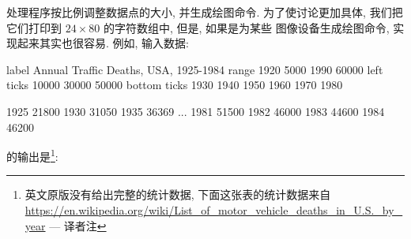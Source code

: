 处理程序按比例调整数据点的大小, 并生成绘图命令. 为了使讨论更加具体,
我们把它们打印到 $24 \times 80$ 的字符数组中, 但是, 如果是为某些
图像设备生成绘图命令, 实现起来其实也很容易. 例如, 输入数据:
\begin{awkcode}
    label Annual Traffic Deaths, USA, 1925-1984
    range 1920 5000 1990 60000
    left ticks 10000 30000 50000
    bottom ticks 1930 1940 1950 1960 1970 1980

    1925 21800
    1930 31050
    1935 36369
    ...
    1981 51500
    1982 46000
    1983 44600
    1984 46200
\end{awkcode}
的输出是\footnote{英文原版没有给出完整的统计数据, 下面这张表的统计数据来自
    \url{https://en.wikipedia.org/wiki/List_of_motor_vehicle_deaths_in_U.S._by_year}
 --- 译者注}:

